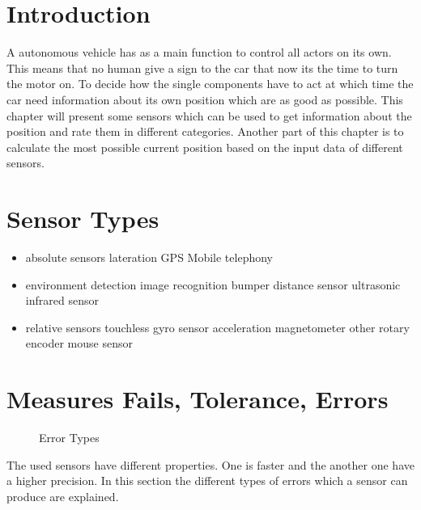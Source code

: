 \section{Introduction}\label{sec:positioningIntroduction}
A autonomous vehicle has as a main function to control all actors on its own.
This means that no human give a sign to the car that now its the time to turn the motor on.
To decide how the single components have to act at which time 
the car need information about its own position which are as good as possible.
This chapter will present some sensors which can be used to get information about the position and rate them in different categories.
Another part of this chapter is to calculate the most possible current position based on the input data of different sensors.


\section{Sensor Types}
\begin{itemize}
\item absolute sensors
	\subitem lateration
		\subsubitem GPS	
		\subsubitem Mobile telephony
\item environment detection
	\subitem image recognition
	\subitem bumper
	\subitem distance sensor
		\subsubitem ultrasonic
		\subsubitem infrared sensor
\item relative sensors
	\subitem touchless
		\subsubitem gyro sensor
		\subsubitem acceleration
		\subsubitem magnetometer
	\subitem other
		\subsubitem rotary encoder
		\subsubitem mouse sensor
\end{itemize}


\section{Measures Fails, Tolerance, Errors}
\begin{figure}
\caption{Error Types \cite{img:precisionDarts}}
\label{fig:errorTypes}
\end{figure}
The used sensors have different properties.
One is faster and the another one have a higher precision.
In this section the different types of errors which a sensor can produce are explained.


